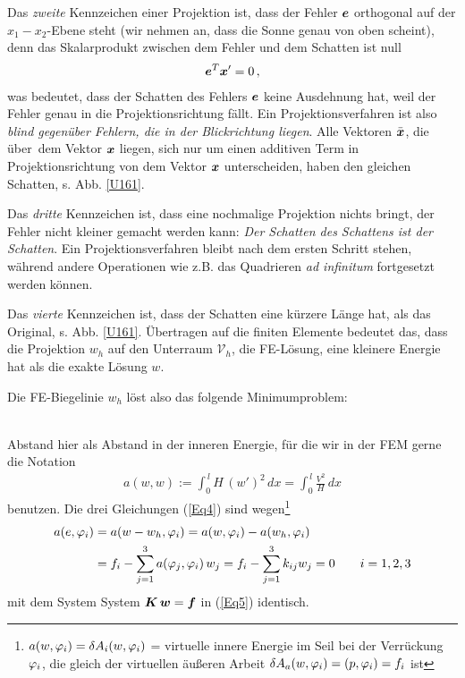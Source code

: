 Das {\em zweite} Kennzeichen einer Projektion ist, dass der Fehler $\mbox{\boldmath $e$}$ orthogonal auf der $x_1\!-\! x_2$-Ebene steht (wir nehmen an, dass die Sonne genau von oben scheint), denn das Skalarprodukt zwischen dem Fehler und dem Schatten ist null
\begin{align}
\mbox{\boldmath $e$}^T \mbox{\boldmath $x$}' = 0 \,,
\end{align}
was bedeutet, dass der Schatten des Fehlers $\mbox{\boldmath $e$}$ keine Ausdehnung hat, weil der Fehler genau in die Projektionsrichtung f\"{a}llt. Ein Projektionsverfahren ist also {\em blind gegen\"{u}ber Fehlern, die in der Blickrichtung liegen}. Alle Vektoren $\bar{\mbox{\boldmath $x$}}$, die \glq \"{u}ber\grq\ dem Vektor $\mbox{\boldmath $x$}$ liegen, sich nur um einen additiven Term in Projektionsrichtung von dem Vektor $\mbox{\boldmath $x$}$ unterscheiden, haben den gleichen Schatten, s. Abb. \ref{U161}.

Das {\em dritte} Kennzeichen ist, dass eine nochmalige Projektion nichts bringt, der Fehler nicht kleiner gemacht werden kann: {\em Der Schatten des Schattens ist der Schatten\/}. Ein Projektionsverfahren bleibt nach dem ersten Schritt stehen, w\"{a}hrend andere Operationen wie z.B. das Quadrieren {\em ad infinitum} fortgesetzt werden k\"{o}nnen.

Das {\em vierte\/} Kennzeichen ist, dass der Schatten eine k\"{u}rzere L\"{a}nge hat, als das Original, s. Abb. \ref{U161}.  \"{U}bertragen auf die finiten Elemente bedeutet das, dass die Projektion $w_h$ auf den Unterraum $\mathcal{V}_{h}$, die FE-L\"{o}sung, eine kleinere Energie hat als die exakte L\"{o}sung $w$.


Die FE-Biegelinie $w_h$ l\"{o}st also das folgende Minimumproblem:

{}\\

Abstand hier als Abstand in der inneren Energie, f\"{u}r die wir in der FEM gerne die Notation
\begin{align}
a(w,w) := \int_0^{\,l} H\,(w')^2\,dx = \int_0^{\,l} \frac{V^2}{H}\,dx
\end{align}
benutzen. Die drei Gleichungen (\ref{Eq4}) sind wegen\footnote{$a(w,\varphi_i) = \delta A_i(w,\varphi_i)$ = virtuelle innere Energie im Seil bei der Verr\"{u}ckung $\varphi_i$, die gleich der virtuellen \"{a}u{\ss}eren Arbeit $\delta A_a(w,\varphi_i) = (p,\varphi_i) = f_i$ ist}
\begin{align}
a(e,\varphi_i) &= a(w - w_h,\varphi_i) = a(w,\varphi_i) - a(w_h,\varphi_i)\nonumber \\
&= f_i - \sum_{j = 1}^3 a(\varphi_j,\varphi_i) \,w_j = f_i - \sum_{j = 1}^3 k_{ij} w_j = 0 \qquad  i = 1,2,3
\end{align}
mit dem System System $\mbox{\boldmath $K$}\,\mbox{\boldmath $w$} = \mbox{\boldmath $f$}$ in (\ref{Eq5}) identisch.

